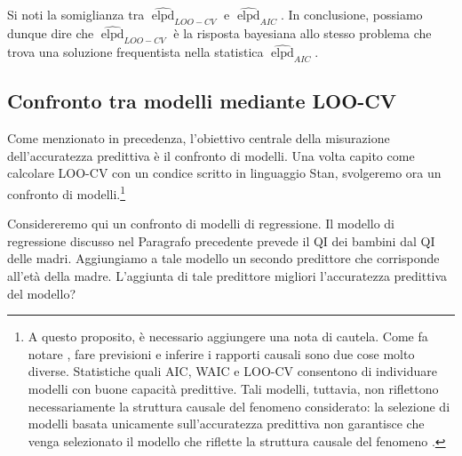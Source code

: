 \documentclass[
  10pt,
  italian,
  a4paper,
  extrafontsizes,onecolumn,openright
  ]{memoir}
\DeclareMathOperator{\elpd}{elpd} %
\theoremstyle{definition}
\theoremstyle{definition}
\theoremstyle{definition}
\theoremstyle{definition}
\theoremstyle{remark}
\begin{document}
\noindent
Si noti la somiglianza tra \(\widehat{\elpd}_{LOO-CV}\) e \(\widehat{\elpd}_{AIC}\). In conclusione, possiamo dunque dire che \(\widehat{\elpd}_{LOO-CV}\) è la risposta bayesiana allo stesso problema che trova una soluzione frequentista nella statistica \(\widehat{\elpd}_{AIC}\).

\hypertarget{confronto-tra-modelli-mediante-loo-cv}{%
\subsection{Confronto tra modelli mediante LOO-CV}\label{confronto-tra-modelli-mediante-loo-cv}}

Come menzionato in precedenza, l'obiettivo centrale della misurazione dell'accuratezza predittiva è il confronto di modelli. Una volta capito come calcolare LOO-CV con un condice scritto in linguaggio Stan, svolgeremo ora un confronto di modelli.\footnote{A questo proposito, è necessario aggiungere una nota di cautela. Come fa notare \textcite{McElreath_rethinking}, fare previsioni e inferire i rapporti causali sono due cose molto diverse. Statistiche quali AIC, WAIC e LOO-CV consentono di individuare modelli con buone capacità predittive. Tali modelli, tuttavia, non riflettono necessariamente la struttura causale del fenomeno considerato: la selezione di modelli basata unicamente sull'accuratezza predittiva non garantisce che venga selezionato il modello che riflette la struttura causale del fenomeno \autocite[si veda anche][]{navarro2019between}.}

Considereremo qui un confronto di modelli di regressione. Il modello di regressione discusso nel Paragrafo precedente prevede il QI dei bambini dal QI delle madri. Aggiungiamo a tale modello un secondo predittore che corrisponde all'età della madre. L'aggiunta di tale predittore migliori l'accuratezza predittiva del modello?
\end{document}
